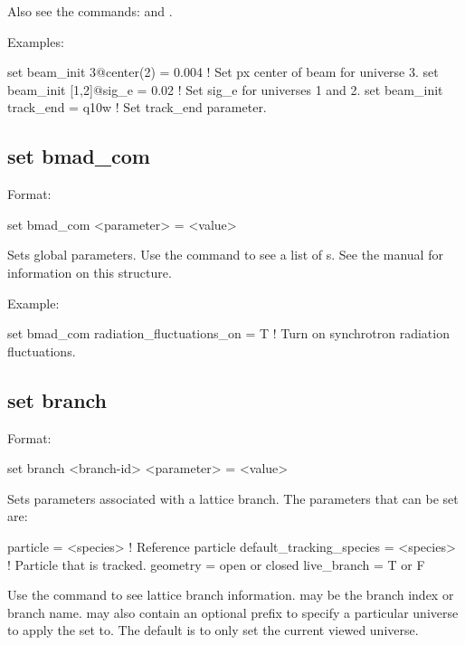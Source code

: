 {{Also see the commands:  and .

Examples:
\begin{example}
  set beam_init 3@center(2) = 0.004   ! Set px center of beam for universe 3.
  set beam_init [1,2]@sig_e = 0.02    ! Set sig_e for universes 1 and 2.
  set beam_init track_end = q10w      ! Set track_end parameter.
\end{example}


\subsection{set bmad_com}
\label{s:set.bmad.com}

Format:
\begin{example}
  set bmad_com <parameter> = <value>
\end{example}

Sets global \bmad parameters. Use the  command to see a list of
s. See the \bmad manual for information on this structure.

Example:
\begin{example}
  set bmad_com radiation_fluctuations_on = T ! Turn on synchrotron radiation fluctuations.
\end{example}


\subsection{set branch}
\label{s:set.branch}

Format:
\begin{example}
  set branch <branch-id> <parameter> = <value>
\end{example}

Sets parameters associated with a lattice branch. The parameters that can be set are:
\begin{example}
  particle                  = <species>   ! Reference particle
  default_tracking_species  = <species>   ! Particle that is tracked.
  geometry                  = open or closed
  live_branch               = T or F
\end{example}
Use the  command to see lattice branch information.  may be the
branch index or branch name.  may also contain an optional  prefix to
specify a particular universe to apply the set to. The default is to only set the current viewed
universe.

}}
